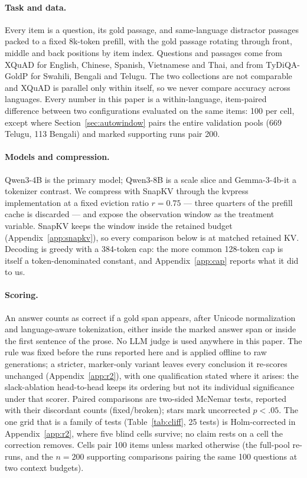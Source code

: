 \documentclass{article}
\begin{document}
\paragraph{Task and data.}
Every item is a question, its gold passage, and same-language distractor
passages packed to a fixed 8k-token prefill, with the gold passage
rotating through front, middle and back positions by item index.
Questions and passages come from XQuAD \citep{artetxe2020xquad} for
English, Chinese, Spanish, Vietnamese and Thai, and from TyDiQA-GoldP
\citep{clark2020tydiqa} for Swahili, Bengali and Telugu. The two
collections are not comparable and XQuAD is parallel only within
itself, so we never compare accuracy across languages. Every number
in this paper is a within-language, item-paired difference between two
configurations evaluated on the same items: 100 per cell, except where
Section~\ref{sec:autowindow} pairs the entire validation pools (669
Telugu, 113 Bengali) and marked supporting runs pair 200.

\paragraph{Models and compression.}
Qwen3-4B \citep{qwen32025} is the primary model; Qwen3-8B is a scale
slice and Gemma-3-4b-it \citep{gemma32025} a tokenizer contrast. We
compress with SnapKV \citep{li2024snapkv} through the kvpress
implementation at a fixed eviction ratio $r{=}0.75$ --- three quarters of
the prefill cache is discarded --- and expose the observation window as
the treatment variable. SnapKV keeps the window inside the retained
budget (Appendix~\ref{app:snapkv}), so every comparison below is at
matched retained KV. Decoding is greedy with a 384-token cap: the more
common 128-token cap is itself a token-denominated constant, and
Appendix~\ref{app:cap} reports what it did to us.

\paragraph{Scoring.}
An answer counts as correct if a gold span appears, after Unicode
normalization and language-aware tokenization, either inside the marked
answer span or inside the first sentence of the prose. No LLM judge is
used anywhere in this paper. The rule was fixed before the runs reported
here and is applied offline to raw generations; a stricter, marker-only
variant leaves every conclusion it re-scores unchanged
(Appendix~\ref{app:r2}), with one qualification stated where it arises:
the slack-ablation head-to-head keeps its ordering but not its
individual significance under that scorer.
Paired comparisons are two-sided McNemar tests, reported with their
discordant counts (fixed/broken); stars mark uncorrected $p<.05$. The
one grid that is a family of tests (Table~\ref{tab:cliff}, 25 tests) is
Holm-corrected in Appendix~\ref{app:r2}, where five blind cells
survive; no claim rests on a cell the correction removes. Cells pair 100 items unless marked
otherwise (the full-pool re-runs, and the $n{=}200$ supporting
comparisons pairing the same 100 questions at two context budgets).
\end{document}

